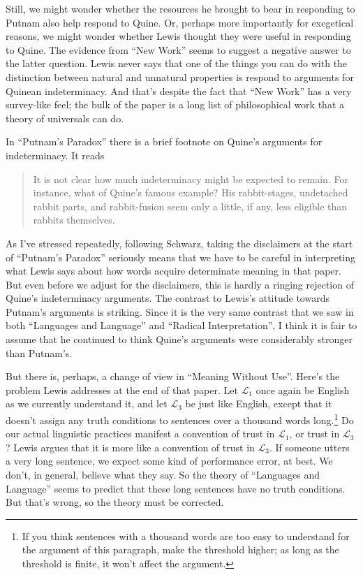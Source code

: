 Still, we might wonder whether the resources he brought to bear in responding to Putnam also help respond to Quine. Or, perhaps more importantly for exegetical reasons, we might wonder whether Lewis thought they were useful in responding to Quine. The evidence from ``New Work'' seems to suggest a negative answer to the latter question. Lewis never says that one of the things you can do with the distinction between natural and unnatural properties is respond to arguments for Quinean indeterminacy. And that's despite the fact that ``New Work'' has a very survey-like feel; the bulk of the paper is a long list of philosophical work that a theory of universals can do. 

In ``Putnam's Paradox'' there is a brief footnote on Quine's arguments for indeterminacy. It reads

\begin{quote}
It is not clear how much indeterminacy might be expected to remain. For instance, what of Quine's famous example? His rabbit-stages, undetached rabbit parts, and rabbit-fusion seem only a little, if any, less eligible than rabbits themselves. \citep[228n]{Lewis1984b}
\end{quote}

\noindent As I've stressed repeatedly, following Schwarz, taking the disclaimers at the start of ``Putnam's Paradox'' seriously means that we have to be careful in interpreting what Lewis says about how words acquire determinate meaning in that paper. But even before we adjust for the disclaimers, this is hardly a ringing rejection of Quine's indeterminacy arguments. The contrast to Lewis's attitude towards Putnam's arguments is striking. Since it is the very same contrast that we saw in both ``Languages and Language'' and ``Radical Interpretation'', I think it is fair to assume that he continued to think Quine's arguments were considerably stronger than Putnam's.

But there is, perhaps, a change of view in ``Meaning Without Use''. Here's the problem Lewis addresses at the end of that paper. Let $\mathcal{L}_1$ once again be English as we currently understand it, and let $\mathcal{L}_3$ be just like English, except that it doesn't assign any truth conditions to sentences over a thousand words long.\footnote{If you think sentences with a thousand words are too easy to understand for the argument of this paragraph, make the threshold higher; as long as the threshold is finite, it won't affect the argument.} Do our actual linguistic practices manifest a convention of trust in $\mathcal{L}_1$, or trust in $\mathcal{L}_3$? Lewis argues that it is more like a convention of trust in $\mathcal{L}_3$. If someone utters a very long sentence, we expect some kind of performance error, at best. We don't, in general, believe what they say. So the theory of ``Languages and Language'' seems to predict that these long sentences have no truth conditions. But that's wrong, so the theory must be corrected.

